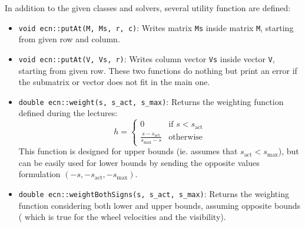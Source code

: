 \documentclass{ecnreport}
\begin{document}
In addition to the given classes and solvers, several utility function are defined:
\begin{itemize}
 \item \texttt{void ecn::putAt(M, Ms, r, c)}: Writes matrix \texttt{Ms} inside matrix \texttt{M}, starting from given row and column.
 \item \texttt{void ecn::putAt(V, Vs, r)}: Writes column vector \texttt{Vs} inside vector \texttt{V}, starting from given row. These two functions do nothing but print an error
 if the submatrix or vector does not fit in the main one.
 \item \texttt{double ecn::weight(s, s\_act, s\_max)}: Returns the weighting function defined during the lectures:
 \begin{equation*}
  h = \left\{\begin{array}{cl}
              0 & \text{if } s < s_{\text{act}} \\
              \displaystyle \frac{s-s_{\text{act}}}{s_{\max}-s} & \text{otherwise}
             \end{array}\right.
 \end{equation*}This function is designed for upper bounds (ie. assumes that $s_{\text{act}} < s_{\text{max}}$), but can be easily used for lower bounds by sending the opposite values formulation
 $(-s,-s_{\text{act}}, -s_{\max})$.
\item \texttt{double ecn::weightBothSigns(s, s\_act, s\_max)}: Returns the weighting function considering both lower and upper bounds, assuming opposite bounds (
which is true for the wheel velocities and the visibility).
\end{itemize}
\end{document}
